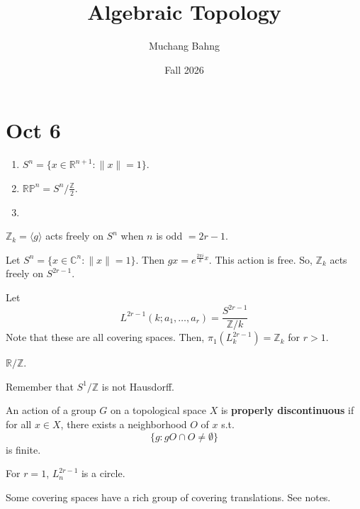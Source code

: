 \documentclass{article}
\newcounter{definition}[section]
\newcounter{example}[section]
\begin{document}
\title{Algebraic Topology}
\author{Muchang Bahng}
\date{Fall 2026}

\maketitle
\tableofcontents
\pagebreak





\section{Oct 6} 

	\begin{example}
	  \label{ex:spheres-projective-and-lens-spaces}
		\begin{enumerate}
		  \item $S^n = \{x \in \mathbb{R}^{n+1} \colon \|x\| = 1\}$. 
			\item $\mathbb{RP}^n = S^n / \frac{\mathbb{Z}}{2}$. 
			\item 
		\end{enumerate}
	\end{example}

	$\mathbb{Z}_k = \langle g \rangle$ acts freely on $S^n$ when $n$ is odd $= 2r - 1$. 

	Let $S^n = \{x \in \mathbb{C}^n \colon \|x\| = 1\}$. Then $gx = e^{\frac{2\pi i}{k} x}$. This action is free. So, $\mathbb{Z}_k$ acts freely on $S^{2r - 1}$. 

	\begin{example}
	  \label{ex:lens-spaces-as-quotients-of-spheres}
		Let 
		\begin{equation}
			L^{2r - 1}(k; a_1, \ldots, a_r) = \frac{S^{2r-1}}{\mathbb{Z}/k}
		\end{equation}
		Note that these are all covering spaces. Then, $\pi_1 (L_k^{2r-1}) = \mathbb{Z}_k$ for $r > 1$. 
	\end{example}

	$\mathbb{R}/\mathbb{Z}$. 

	Remember that $S^1 / \mathbb{Z}$ is not Hausdorff. 

	\begin{definition}
	  \label{def:properly-discontinuous-action}
	  An action of a group $G$ on a topological space $X$ is \textbf{properly discontinuous} if for all $x \in X$, there exists a neighborhood $O$ of $x$ s.t. 
		\begin{equation}
			\{g \colon gO \cap O \neq \emptyset \} 
		\end{equation}
		is finite. 
	\end{definition}

	For $r = 1$, $L_n^{2r - 1}$ is a circle. 

	Some covering spaces have a rich group of covering translations. See notes. 
\end{document}
